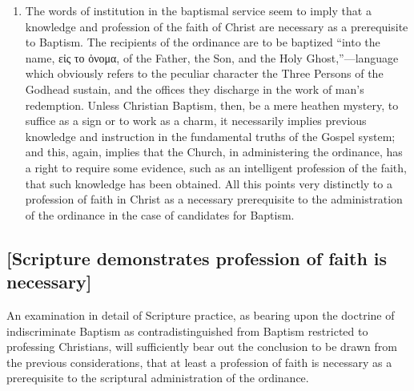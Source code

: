 \documentclass[
  english,
]{book}
\newcommand{\textgreek}[2][]{\foreignlanguage{greek}{#2}}
\begin{document}
\begin{enumerate}
\item
  The words of institution in the baptismal service seem to imply that a knowledge and profession of the faith of Christ are necessary as a prerequisite to Baptism. The recipients of the ordinance are to be baptized ``into the name, \textgreek{εἰς το ὀνομα}, of the Father, the Son, and the Holy Ghost,''---language which obviously refers to the peculiar character the Three Persons of the Godhead sustain, and the offices they discharge in the work of man's redemption. Unless Christian Baptism, then, be a mere heathen mystery, to suffice as a sign or to work as a charm, it necessarily implies previous knowledge and instruction in the fundamental truths of the Gospel system; and this, again, implies that the Church, in administering the ordinance, has a right to require some evidence, such as an intelligent profession of the faith, that such knowledge has been obtained. All this points very distinctly to a profession of faith in Christ as a necessary prerequisite to the administration of the ordinance in the case of candidates for Baptism.
\end{enumerate}

\hypertarget{scripture-demonstrates-profession-of-faith-is-necessary}{%
\subsection{{[}Scripture demonstrates profession of faith is necessary{]}}\label{scripture-demonstrates-profession-of-faith-is-necessary}}

An examination in detail of Scripture practice, as bearing upon the doctrine of indiscriminate Baptism as contradistinguished from Baptism restricted to professing Christians, will sufficiently bear out the conclusion to be drawn from the previous considerations, that at least a profession of faith is necessary as a prerequisite to the scriptural administration of the ordinance.
\end{document}
